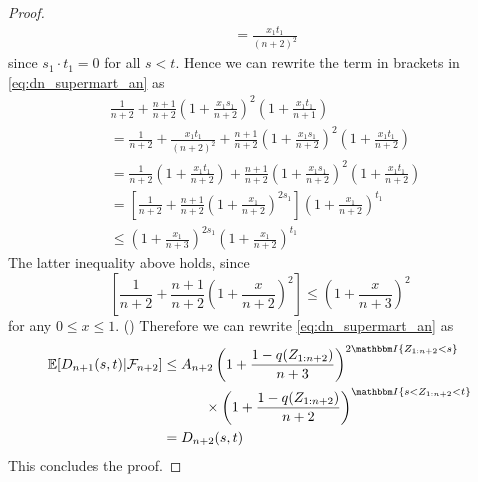 \begin{lemma}
\begin{proof}
\begin{align*}
			&= \frac{x_1t_1}{(n+2)^2}
		\end{align*}
		since $s_1\cdot t_1=0$ for all $s<t$. Hence we can rewrite the term in brackets in \eqref{eq:dn_supermart_an} as 
		\begin{align*}
			&\frac{1}{n+2} + \frac{n+1}{n+2}\left(1+\frac{x_1s_1}{n+2}\right)^{2} \left(1+\frac{x_1t_1}{n+1}\right) \\
			&=\frac{1}{n+2} + \frac{x_1t_1}{(n+2)^2} + \frac{n+1}{n+2}\left(1+\frac{x_1s_1}{n+2}\right)^{2}\left(1+\frac{x_1t_1}{n+2}\right)\\
			&=\frac{1}{n+2}\left(1+\frac{x_1t_1}{n+2}\right) + \frac{n+1}{n+2}\left(1+\frac{x_1s_1}{n+2}\right)^{2}\left(1+\frac{x_1t_1}{n+2}\right)\\
			&=\left[\frac{1}{n+2} + \frac{n+1}{n+2}\left(1+\frac{x_1}{n+2}\right)^{2s_1}\right]\left(1+\frac{x_1}{n+2}\right)^{t_1}\\
			&\leq \left(1+\frac{x_1}{n+3}\right)^{2s_1}\left(1+\frac{x_1}{n+2}\right)^{t_1}
		\end{align*}
		The latter inequality above holds, since 
		$$\left[\frac{1}{n+2} + \frac{n+1}{n+2}\left(1+\frac{x}{n+2}\right)^{2}\right] \leq \left(1+\frac{x}{n+3}\right)^{2}$$
		for any $0\leq x\leq 1$. ()
		Therefore we can rewrite \eqref{eq:dn_supermart_an} as
		\begin{align*}
			\E[D_{n+1}(s,t)| \F_{n+2}]	&\leq A_{n+2} \left(1+\frac{1-q(Z_{1:n+2})}{n+3}\right)^{2\I{Z_{1:n+2}<s}} \\
			&\qquad\quad \times \left(1+\frac{1-q(Z_{1:n+2})}{n+2}\right)^{\I{s<Z_{1:n+2} <t}}\\
			&= D_{n+2}(s,t)
		\end{align*}		
		This concludes the proof.
	\end{proof}
\end{lemma}
%
